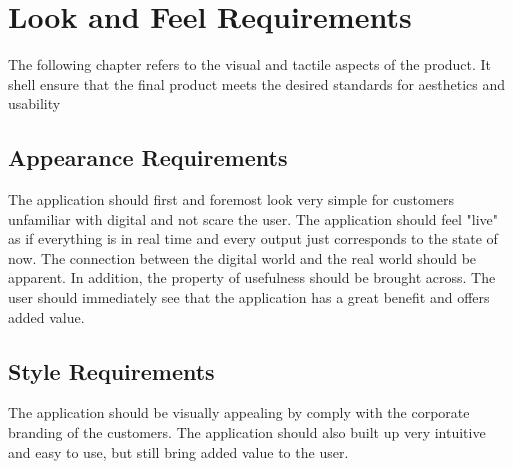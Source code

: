 \chapter{Look and Feel Requirements}
\label{chap:lookandfeel}

The following chapter refers to the visual and tactile aspects of the product. It shell ensure that the final product meets the desired standards for aesthetics and usability
\section{Appearance Requirements}
The application should first and foremost look very simple for customers unfamiliar with digital and not scare the user.
The application should feel "live" as if everything is in real time and every output just corresponds to the state of now. 
The connection between the digital world and the real world should be apparent. 
In addition, the property of usefulness should be brought across. The user should immediately see that the application has a great benefit and offers added value.
\section{Style Requirements}
The application should be visually appealing by comply with the corporate branding of the customers.
The application should also built up very intuitive and easy to use, but still bring added value to the user.